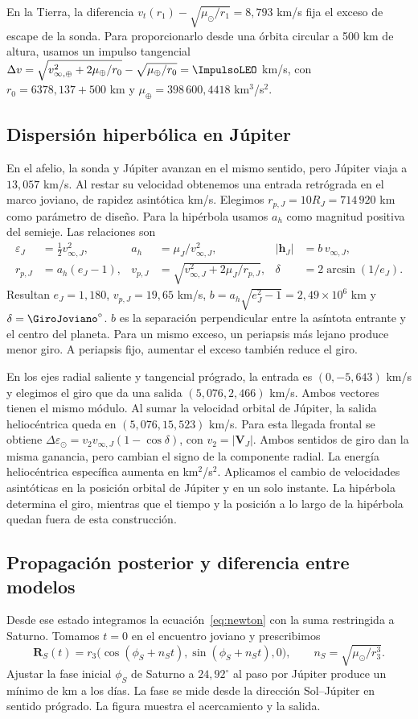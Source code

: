 \documentclass[11pt,letterpaper]{article}
\newcommand{\vect}[1]{\mathbf{#1}}
\begin{document}
En la Tierra, la diferencia $v_t(r_1)-\sqrt{\mu_\odot/r_1}=8{,}793$ km/s fija el exceso de escape de la sonda. Para proporcionarlo desde una órbita circular a 500 km de altura, usamos un impulso tangencial
$\Delta v=\sqrt{v_{\infty,\oplus}^2+2\mu_\oplus/r_0}-\sqrt{\mu_\oplus/r_0}=\ImpulsoLEO$ km/s, con $r_0=6378{,}137+500$ km y $\mu_\oplus=398\,600{,}4418$ km$^3$/s$^2$.

\subsection{Dispersión hiperbólica en Júpiter}
En el afelio, la sonda y Júpiter avanzan en el mismo sentido, pero Júpiter viaja a $13{,}057$ km/s. Al restar su velocidad obtenemos una entrada retrógrada en el marco joviano, de rapidez asintótica \ExcesoJoviano{} km/s. Elegimos $r_{p,J}=10R_J=714\,920$ km como parámetro de diseño. Para la hipérbola usamos $a_h$ como magnitud positiva del semieje. Las relaciones son
\begin{align*}
\varepsilon_J &= \tfrac12 v_{\infty,J}^2, &
a_h &= \mu_J/v_{\infty,J}^2, &
|\vect h_J| &= b\,v_{\infty,J},\\
r_{p,J} &= a_h(e_J-1), &
v_{p,J} &= \sqrt{v_{\infty,J}^2+2\mu_J/r_{p,J}}, &
\delta &= 2\arcsin(1/e_J).
\end{align*}
Resultan $e_J=1{,}180$, $v_{p,J}=19{,}65$ km/s, $b=a_h\sqrt{e_J^2-1}=2{,}49\times10^6$ km y $\delta=\GiroJoviano^\circ$.
$b$ es la separación perpendicular entre la asíntota entrante y el centro del planeta. Para un mismo exceso, un periapsis más lejano produce menor giro. A periapsis fijo, aumentar el exceso también reduce el giro.

En los ejes radial saliente y tangencial prógrado, la entrada es $(0,-5{,}643)$ km/s y elegimos el giro que da una salida $(5{,}076,2{,}466)$ km/s. Ambos vectores tienen el mismo módulo. Al sumar la velocidad orbital de Júpiter, la salida heliocéntrica queda en $(5{,}076,15{,}523)$ km/s. Para esta llegada frontal se obtiene $\Delta\varepsilon_\odot=v_2 v_{\infty,J}(1-\cos\delta)$, con $v_2=|\vect V_J|$. Ambos sentidos de giro dan la misma ganancia, pero cambian el signo de la componente radial. La energía heliocéntrica específica aumenta en \EnergiaGanada{} km$^2$/s$^2$. Aplicamos el cambio de velocidades asintóticas en la posición orbital de Júpiter y en un solo instante. La hipérbola determina el giro, mientras que el tiempo y la posición a lo largo de la hipérbola quedan fuera de esta construcción.

\subsection{Propagación posterior y diferencia entre modelos}
Desde ese estado integramos la ecuación~\eqref{eq:newton} con la suma restringida a Saturno. Tomamos $t=0$ en el encuentro joviano y prescribimos
\[
\vect R_S(t)=r_3\bigl(\cos(\phi_S+n_St),\sin(\phi_S+n_St),0\bigr),
\qquad n_S=\sqrt{\mu_\odot/r_3^3}.
\]
Ajustar la fase inicial $\phi_S$ de Saturno a $24{,}92^\circ$ al paso por Júpiter produce un mínimo de \MinimoDiseno{} km a los \DiasDiseno{} días. La fase se mide desde la dirección Sol--Júpiter en sentido prógrado. La figura muestra el acercamiento y la salida.
\end{document}
